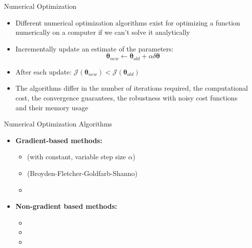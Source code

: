 \begin{frame}{Numerical Optimization}{}\important
	\begin{itemize}
		\item Different numerical optimization algorithms exist for optimizing a function numerically on a computer if we can't solve it analytically
		\item {} Incrementally update an estimate of the parameters:
		\begin{equation}
			\bm{\theta}_{new} \longleftarrow \bm{\theta}_{old} + \alpha \delta \bm{\theta}
		\end{equation}
		\item After each update: $\mathcal{J}(\bm{\theta}_{new}) < \mathcal{J}(\bm{\theta}_{old})$
		\item The algorithms differ in the number of iterations required, the computational cost, the convergence guarantees,
			the robustness with noisy cost functions and their memory usage
	\end{itemize}
\end{frame}

\begin{frame}{Numerical Optimization Algorithms}{}
	\begin{itemize}
		\item \textbf{Gradient-based methods:}
		\begin{itemize}
			\item {} (with constant, variable step size $\alpha$)
			\item {} (Broyden-Fletcher-Goldfarb-Shanno)
			\item {}
		\end{itemize}
		\item \textbf{Non-gradient based methods:}
		\begin{itemize}
			\item {}
			\item {}
			\item {}
		\end{itemize}
	\end{itemize}
	
	\begin{boxBlueNoFrame}
	\end{boxBlueNoFrame}
\end{frame}



